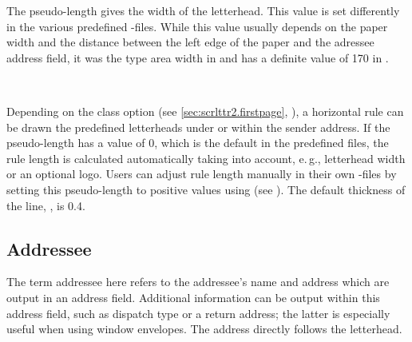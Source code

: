 \begin{Declaration}
\end{Declaration}
%
The pseudo-length  gives the width of the
letterhead. This value is set differently in the various predefined
-files.
While this value usually depends on the paper width and the distance between
the left edge of the paper and the adressee address field, it was the type
area width in  and has a definite value of 170 in
.%
%
%


\begin{Declaration}
  \\
\end{Declaration}
%
%
Depending on the class option  (see
\autoref{sec:scrlttr2.firstpage},
), a horizontal rule can be drawn
the predefined letterheads under or within the sender
address. If the pseudo-length  has
a value of 0, which is the default in the predefined 
files, the rule length is calculated automatically taking into account,
e.\,g., letterhead width or an optional logo. Users can adjust rule length
manually in their own -files by setting this pseudo-length to
positive values using \Macro{\@setplength} (see
). The default thickness of
the line, , is
0.4.%
%
%
%
%
%


\subsection{Addressee}
\label{sec:scrlttr2-experts.addressee}%

The term addressee here refers to the addressee's name and address which
are output in an address field. Additional information can be output
within this address field, such as dispatch type or a return address;
the latter is especially useful when using window envelopes. The
address directly follows the letterhead.

